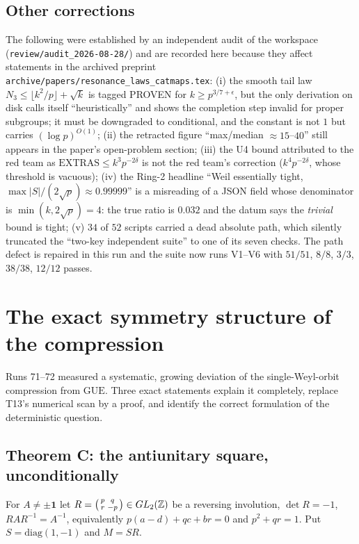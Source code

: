 \documentclass[11pt,reqno]{amsart}
\theoremstyle{definition}
\newcommand{\ZZ}{\mathbb{Z}}
\newcommand{\GUE}{\mathrm{GUE}}
\begin{document}
\subsection{Other corrections}
The following were established by an independent audit of the workspace
(\texttt{review/audit\_2026-08-28/}) and are recorded here because they affect
statements in the archived preprint \texttt{archive/papers/resonance\_laws\_catmaps.tex}:
(i) the smooth tail law $N_3\le\lfloor k^2/p\rfloor+\sqrt k$ is tagged PROVEN for
$k\ge p^{3/7+\epsilon}$, but the only derivation on disk calls itself
``heuristically'' and shows the completion step invalid for proper subgroups; it
must be downgraded to conditional, and the constant is not $1$ but carries
$(\log p)^{O(1)}$; (ii) the retracted figure ``max/median $\approx15$--$40$''
still appears in the paper's open-problem section; (iii) the U4 bound attributed
to the red team as $\mathrm{EXTRAS}\le k^3p^{-2\delta}$ is not the red team's
correction ($k^4p^{-2\delta}$, whose threshold is vacuous); (iv) the Ring-2
headline ``Weil essentially tight, $\max|S|/(2\sqrt p)\approx0.99999$'' is a
misreading of a JSON field whose denominator is $\min(k,2\sqrt p)=4$: the true
ratio is $0.032$ and the datum says the \emph{trivial} bound is tight;
(v) $34$ of $52$ scripts carried a dead absolute path, which silently truncated
the ``two-key independent suite'' to one of its seven checks. The path defect is
repaired in this run and the suite now runs V1--V6 with $51/51$, $8/8$, $3/3$,
$38/38$, $12/12$ passes.

\section{The exact symmetry structure of the compression}\label{sec:symmetry}

Runs 71--72 measured a systematic, growing deviation of the single-Weyl-orbit
compression from $\GUE$. Three exact statements explain it completely, replace
T13's numerical scan by a proof, and identify the correct formulation of the
deterministic question.

\subsection{Theorem C: the antiunitary square, unconditionally}

For $A\neq\pm\mathbf1$ let $R=\begin{psmallmatrix}p&q\\r&-p\end{psmallmatrix}
\in GL_2(\ZZ)$ be a reversing involution, $\det R=-1$, $RAR^{-1}=A^{-1}$,
equivalently $p(a-d)+qc+br=0$ and $p^2+qr=1$. Put $S=\mathrm{diag}(1,-1)$ and
$M=SR$.
\end{document}
